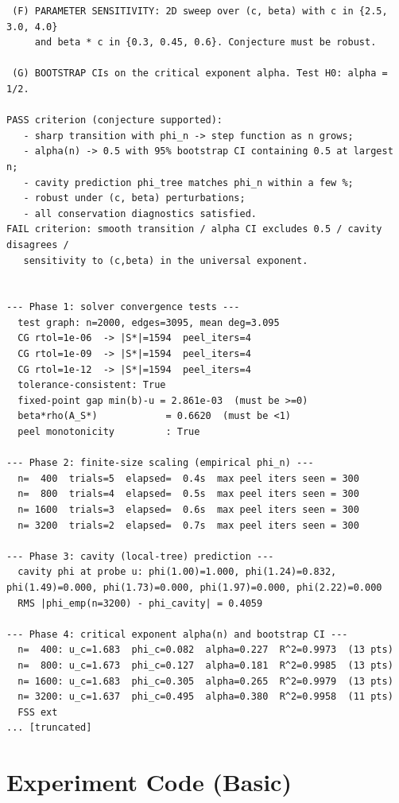 \documentclass[11pt]{article}
\begin{document}
\begin{lstlisting}
 (F) PARAMETER SENSITIVITY: 2D sweep over (c, beta) with c in {2.5, 3.0, 4.0}
     and beta * c in {0.3, 0.45, 0.6}. Conjecture must be robust.

 (G) BOOTSTRAP CIs on the critical exponent alpha. Test H0: alpha = 1/2.

PASS criterion (conjecture supported):
   - sharp transition with phi_n -> step function as n grows;
   - alpha(n) -> 0.5 with 95% bootstrap CI containing 0.5 at largest n;
   - cavity prediction phi_tree matches phi_n within a few %;
   - robust under (c, beta) perturbations;
   - all conservation diagnostics satisfied.
FAIL criterion: smooth transition / alpha CI excludes 0.5 / cavity disagrees /
   sensitivity to (c,beta) in the universal exponent.


--- Phase 1: solver convergence tests ---
  test graph: n=2000, edges=3095, mean deg=3.095
  CG rtol=1e-06  -> |S*|=1594  peel_iters=4
  CG rtol=1e-09  -> |S*|=1594  peel_iters=4
  CG rtol=1e-12  -> |S*|=1594  peel_iters=4
  tolerance-consistent: True
  fixed-point gap min(b)-u = 2.861e-03  (must be >=0)
  beta*rho(A_S*)            = 0.6620  (must be <1)
  peel monotonicity         : True

--- Phase 2: finite-size scaling (empirical phi_n) ---
  n=  400  trials=5  elapsed=  0.4s  max peel iters seen = 300
  n=  800  trials=4  elapsed=  0.5s  max peel iters seen = 300
  n= 1600  trials=3  elapsed=  0.6s  max peel iters seen = 300
  n= 3200  trials=2  elapsed=  0.7s  max peel iters seen = 300

--- Phase 3: cavity (local-tree) prediction ---
  cavity phi at probe u: phi(1.00)=1.000, phi(1.24)=0.832, phi(1.49)=0.000, phi(1.73)=0.000, phi(1.97)=0.000, phi(2.22)=0.000
  RMS |phi_emp(n=3200) - phi_cavity| = 0.4059

--- Phase 4: critical exponent alpha(n) and bootstrap CI ---
  n=  400: u_c=1.683  phi_c=0.082  alpha=0.227  R^2=0.9973  (13 pts)
  n=  800: u_c=1.673  phi_c=0.127  alpha=0.181  R^2=0.9985  (13 pts)
  n= 1600: u_c=1.683  phi_c=0.305  alpha=0.265  R^2=0.9979  (13 pts)
  n= 3200: u_c=1.637  phi_c=0.495  alpha=0.380  R^2=0.9958  (11 pts)
  FSS ext
... [truncated]
\end{lstlisting}


\section{Experiment Code (Basic)}
\end{document}

